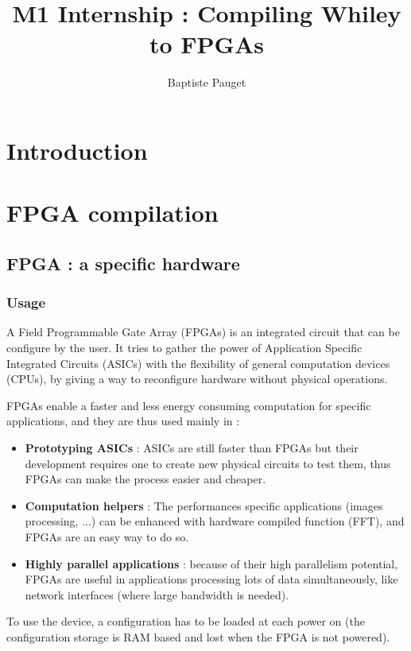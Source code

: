 \documentclass[10pt,a4paper]{article}
\author{Baptiste Pauget}
\title{M1 Internship : Compiling Whiley to FPGAs}
\begin{document}
\maketitle
\section*{Introduction}
\tableofcontents

\section{FPGA compilation}

\subsection{FPGA : a specific hardware}

\subsubsection{Usage}

A Field Programmable Gate Array (FPGAs) is an integrated circuit that can be configure by the user.
It tries to gather the power of Application Specific Integrated Circuits (ASICs) with the flexibility of general computation devices (CPUs), by giving a way to reconfigure hardware without physical operations.

FPGAs enable a faster and less energy consuming computation for specific applications, and they are thus used mainly in :
\begin{itemize}
	\item \textbf{Prototyping ASICs} : ASICs are still faster than FPGAs but their development requires one to create new physical circuits to test them, thus FPGAs can make the process easier and cheaper.
	\item \textbf{Computation helpers} : The performances specific applications (images processing, ...) can be enhanced with hardware compiled function (FFT), and FPGAs are an easy way to do so.
	\item \textbf{Highly parallel applications} : because of their high parallelism potential, FPGAs are useful in applications processing lots of data simultaneously, like network interfaces (where large bandwidth is needed).
\end{itemize}

To use the device, a configuration has to be loaded at each power on (the configuration storage is RAM based and lost when the FPGA is not powered).
\end{document}
